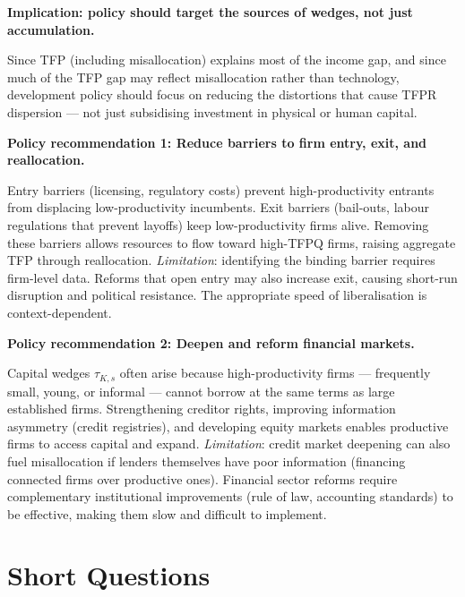 \documentclass[a4paper,11pt]{article}
\begin{document}
\begin{answerbox}
\textbf{Implication: policy should target the sources of wedges, not just accumulation.}

Since TFP (including misallocation) explains most of the income gap, and since much of
the TFP gap may reflect misallocation rather than technology, development policy should
focus on reducing the distortions that cause TFPR dispersion --- not just subsidising
investment in physical or human capital.

\textbf{Policy recommendation 1: Reduce barriers to firm entry, exit, and reallocation.}

Entry barriers (licensing, regulatory costs) prevent high-productivity entrants from
displacing low-productivity incumbents. Exit barriers (bail-outs, labour regulations that
prevent layoffs) keep low-productivity firms alive. Removing these barriers allows
resources to flow toward high-TFPQ firms, raising aggregate TFP through reallocation.
\textit{Limitation}: identifying the binding barrier requires firm-level data. Reforms
that open entry may also increase exit, causing short-run disruption and political
resistance. The appropriate speed of liberalisation is context-dependent.

\textbf{Policy recommendation 2: Deepen and reform financial markets.}

Capital wedges $\tau_{K,s}$ often arise because high-productivity firms --- frequently
small, young, or informal --- cannot borrow at the same terms as large established firms.
Strengthening creditor rights, improving information asymmetry (credit registries), and
developing equity markets enables productive firms to access capital and expand.
\textit{Limitation}: credit market deepening can also fuel misallocation if lenders
themselves have poor information (financing connected firms over productive ones).
Financial sector reforms require complementary institutional improvements (rule of law,
accounting standards) to be effective, making them slow and difficult to implement.
\end{answerbox}

\clearpage

\section{Short Questions}
\end{document}
